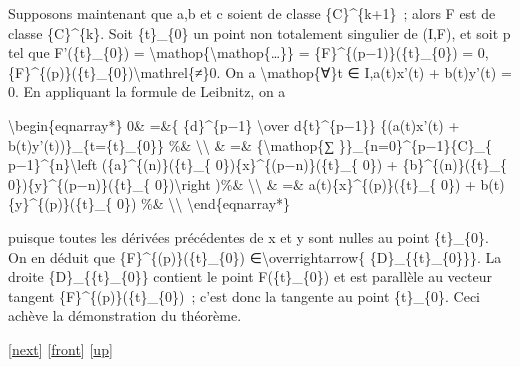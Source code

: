 \documentclass[]{article}
\begin{document}
Supposons maintenant que a,b et c soient de classe \{C\}\^{}\{k+1\}~;
alors F est de classe \{C\}\^{}\{k\}. Soit \{t\}\_\{0\} un point non
totalement singulier de (I,F), et soit p tel que F'(\{t\}\_\{0\}) =
\textbackslash{}mathop\{\textbackslash{}mathop\{\ldots{}\}\} =
\{F\}\^{}\{(p−1)\}(\{t\}\_\{0\}) = 0,
\{F\}\^{}\{(p)\}(\{t\}\_\{0\})\textbackslash{}mathrel\{≠\}0. On a
\textbackslash{}mathop\{∀\}t ∈ I,a(t)x'(t) + b(t)y'(t) = 0. En
appliquant la formule de Leibnitz, on a

\textbackslash{}begin\{eqnarray*\} 0\& =\&\{ \{d\}\^{}\{p−1\}
\textbackslash{}over d\{t\}\^{}\{p−1\}\} \{(a(t)x'(t) +
b(t)y'(t))\}\_\{t=\{t\}\_\{0\}\} \%\& \textbackslash{}\textbackslash{}
\& =\& \{\textbackslash{}mathop\{∑ \}\}\_\{n=0\}\^{}\{p−1\}\{C\}\_\{
p−1\}\^{}\{n\}\textbackslash{}left (\{a\}\^{}\{(n)\}(\{t\}\_\{
0\})\{x\}\^{}\{(p−n)\}(\{t\}\_\{ 0\}) + \{b\}\^{}\{(n)\}(\{t\}\_\{
0\})\{y\}\^{}\{(p−n)\}(\{t\}\_\{ 0\})\textbackslash{}right )\%\&
\textbackslash{}\textbackslash{} \& =\& a(t)\{x\}\^{}\{(p)\}(\{t\}\_\{
0\}) + b(t)\{y\}\^{}\{(p)\}(\{t\}\_\{ 0\}) \%\&
\textbackslash{}\textbackslash{} \textbackslash{}end\{eqnarray*\}

puisque toutes les dérivées précédentes de x et y sont nulles au point
\{t\}\_\{0\}. On en déduit que \{F\}\^{}\{(p)\}(\{t\}\_\{0\})
∈\textbackslash{}overrightarrow\{ \{D\}\_\{\{t\}\_\{0\}\}\}. La droite
\{D\}\_\{\{t\}\_\{0\}\} contient le point F(\{t\}\_\{0\}) et est
parallèle au vecteur tangent \{F\}\^{}\{(p)\}(\{t\}\_\{0\})~; c'est donc
la tangente au point \{t\}\_\{0\}. Ceci achève la démonstration du
théorème.

{[}\href{coursse97.html}{next}{]} {[}\href{coursse96.html}{front}{]}
{[}\href{coursch19.html\#coursse96.html}{up}{]}
\end{document}
